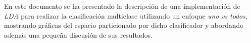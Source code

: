 \documentclass[journal]{IEEEtran}
\begin{document}
En este documento se ha presentado la descripción de una implementación de \emph{LDA} para realizar la clasificación multiclase utilizando un enfoque \emph{uno vs todos}, mostrando gráficas del espacio particionado por dicho clasificador y abordando además una pequeña discusión de sus resultados.

\nocite{*}


\end{document}
